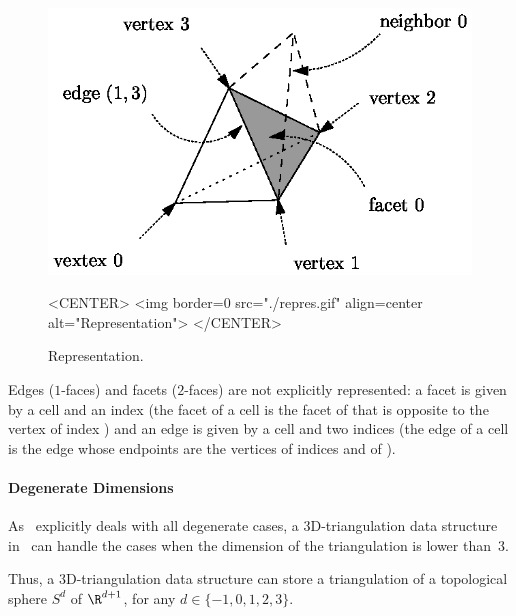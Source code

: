 \begin{figure}
\begin{ccTexOnly}
\begin{center} 
\includegraphics{repres.eps}
\end{center}
\end{ccTexOnly}
\caption{Representation.
\label{TDS3-fig-repres}}
\begin{ccHtmlOnly}
<CENTER>
<img border=0 src="./repres.gif" align=center
alt="Representation">
</CENTER>
\end{ccHtmlOnly}
\end{figure} 

Edges ($1$-faces) and facets ($2$-faces) are not explicitly
represented: a facet is given by a cell and an index (the facet
 of a cell  is the facet of  that is opposite to
the vertex of index ) and an edge is given by a cell and two
indices (the edge  of a cell  is the edge
whose endpoints are the vertices of indices  and  of
). 

\paragraph{Degenerate Dimensions}
As \cgal\ explicitly deals with all degenerate cases, a
3D-triangulation data structure in \cgal\ can handle the cases when
the dimension of the triangulation is lower than~3.

Thus, a 3D-triangulation data structure can store a triangulation of a
topological sphere $S^d$ of $\R^{d+1}$, for any $d \in \{-1,0,1,2,3\}$. 

